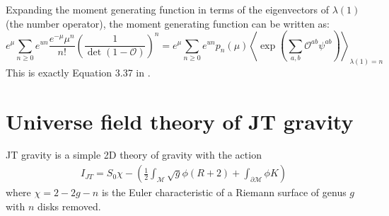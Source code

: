 \documentclass[a4paper,11pt]{article}
\theoremstyle{definition}
\numberwithin{equation}{section}
\newcommand{\lb}{\left(}
\newcommand{\rb}{\right)}
\begin{document}
Expanding the moment generating function in terms of the eigenvectors of $\lambda(1)$ (the number operator), the moment generating function can be written as:
\begin{equation}
    e^\mu\sum_{n\geq 0}e^{un}\frac{e^{-\mu}\mu^n}{n!}\lb \frac{1}{\det(1 - \mathcal{O})} \rb^n = e^\mu\sum_{n\geq 0}e^{un}p_n(\mu)\left\langle\exp\lb \sum_{a,b}\mathcal{O}^{ab}\psi^{ab} \rb\right\rangle_{\lambda(1) = n}
\end{equation}
This is exactly Equation 3.37 in \cite{MM}.
\section{Universe field theory of JT gravity}\label{app:JT}

JT gravity is a simple 2D theory of gravity with the action
\begin{eqnarray}\label{JTaction2}
    I_{JT}=S_0\chi-\left(\frac{1}{2}\int_\mathcal{M}\sqrt{g}\phi(R+2)+\int_{\partial\mathcal{M}}\phi K\right)
\end{eqnarray}
where $\chi=2-2g-n$ is the Euler characteristic of a Riemann surface of genus $g$ with $n$ disks removed.
\end{document}
